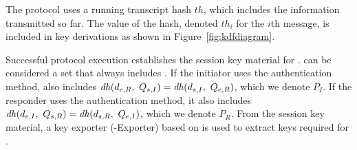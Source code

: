 The protocol uses a running transcript hash $th$, which includes the information
transmitted so far.
%
The value of the hash, denoted $th_i$ for the $i$th message, is included in key
derivations as shown in Figure~\ref{fig:kdfdiagram}.
%

Successful protocol execution establishes the session key material \mSessKey{}
for \mOscore{}.
%
\mSessKey{} can be considered a set that always includes \mGxy{}.
%
If the initiator uses the \mStat{} authentication method, \mSessKey{} also
includes
$\mDH(\mY,\ \mGi{}) = \mDH(\mPriv{I},\ \mGy)$, which we denote $P_I$.
%
If the responder uses the \mStat{} authentication method, it also includes
$\mDH(\mX,\ \mGr{}) = \mDH(\mPriv{R},\ \mGx)$, which we denote $P_R$.
%
From the session key material, a key exporter (\mEdhoc-Exporter) based on
\mHkdf{} is used to extract keys required for \mOscore{}.
%

\begin{figure*}[!h]
\centering
\scalebox{.785}{

}
\caption{Key schedule: Light blue boxes hold DH keys ($P_e, P_I, P_R$),
orange boxes intermediate key material (\mPRKtwo, \mPRKthree, \mPRKfour), and
dark blue boxes keys for \mAead{} or \mXor{} encryption
(\mKtwoe, \mKtwom, \mKthreeae, \mKthreem).
Dashed boxes are conditionals.}
\label{fig:kdfdiagram}
\end{figure*}

